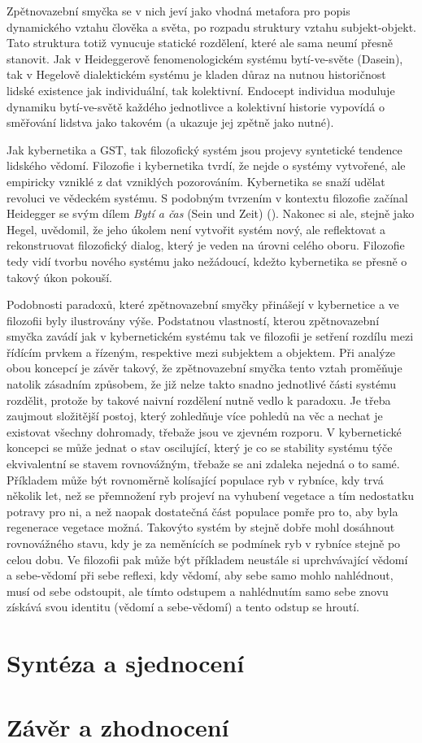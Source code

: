 \documentclass[11pt,a4paper]{article}
\begin{document}
Zpětnovazební smyčka se v nich jeví jako vhodná metafora pro popis dynamického vztahu člověka a světa, po rozpadu struktury vztahu subjekt-objekt. Tato struktura totiž vynucuje statické rozdělení, které ale sama neumí přesně stanovit. Jak v Heideggerově fenomenologickém systému bytí-ve-světe (Dasein), tak v Hegelově dialektickém systému je kladen důraz na nutnou historičnost lidské existence jak individuální, tak kolektivní. Endocept individua moduluje dynamiku bytí-ve-světě každého jednotlivce a kolektivní historie vypovídá o směřování lidstva jako takovém (a ukazuje jej zpětně jako nutné).

Jak kybernetika a GST, tak filozofický systém jsou projevy syntetické tendence lidského vědomí. Filozofie i kybernetika tvrdí, že nejde o systémy vytvořené, ale empiricky vzniklé z dat vzniklých pozorováním. Kybernetika se snaží udělat revoluci ve vědeckém systému. S podobným tvrzením v kontextu filozofie začínal Heidegger se svým dílem \textit{Bytí a čas} (Sein und Zeit) (\cite{heidegger_byti_2002}). Nakonec si ale, stejně jako Hegel, uvědomil, že jeho úkolem není vytvořit systém nový, ale reflektovat a rekonstruovat filozofický dialog, který je veden na úrovni celého oboru. Filozofie tedy vidí tvorbu nového systému jako nežádoucí, kdežto kybernetika se přesně o takový úkon pokouší. 

Podobnosti paradoxů, které zpětnovazební smyčky přinášejí v kybernetice a ve filozofii byly ilustrovány výše. Podstatnou vlastností, kterou zpětnovazební smyčka zavádí jak v kybernetickém systému tak ve filozofii je setření rozdílu mezi řídícím prvkem a řízeným, respektive mezi subjektem a objektem. Při analýze obou koncepcí je závěr takový, že zpětnovazební smyčka tento vztah proměňuje natolik zásadním způsobem, že již nelze takto snadno jednotlivé části systému rozdělit, protože by takové naivní rozdělení nutně vedlo k paradoxu. Je třeba zaujmout složitější postoj, který zohledňuje více pohledů na věc a nechat je existovat všechny dohromady, třebaže jsou ve zjevném rozporu. V kybernetické koncepci se může jednat o stav oscilující, který je co se stability systému týče ekvivalentní se stavem rovnovážným, třebaže se ani zdaleka nejedná o to samé. Příkladem může být rovnoměrně kolísající populace ryb v rybníce, kdy trvá několik let, než se přemnožení ryb projeví na vyhubení vegetace a tím nedostatku potravy pro ni, a než naopak dostatečná část populace pomře pro to, aby byla regenerace vegetace možná. Takovýto systém by stejně dobře mohl dosáhnout rovnovážného stavu, kdy je za neměnících se podmínek ryb v rybníce stejně po celou dobu. Ve filozofii pak může být příkladem neustále si uprchvávající vědomí a sebe-vědomí při sebe reflexi, kdy vědomí, aby sebe samo mohlo nahlédnout, musí od sebe odstoupit, ale tímto odstupem a nahlédnutím samo sebe znovu získává svou identitu (vědomí a sebe-vědomí) a tento odstup se hroutí. 



\section{Syntéza a sjednocení}





\section{Závěr a zhodnocení}


\newpage

\printbibliography[heading=bibintoc, title={Bibliografie}]
\end{document}
